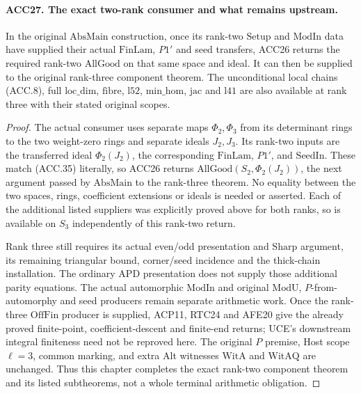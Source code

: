 \documentclass[11pt,a4paper]{article}
\numberwithin{equation}{section}
\theoremstyle{remark}\newtheorem{remark}[theorem]{Remark}
\begin{document}
\paragraph{ACC27. The exact two-rank consumer and what remains upstream.}
\label{claim:ACC27}
In the original \(\mathrm{AbsMain}\) construction, once its
rank-two \(\mathrm{Setup}\) and \(\mathrm{ModIn}\) data have
supplied their actual \(\mathrm{FinLam}\), \(P1'\) and seed
transfers, ACC26 returns the required rank-two \(\mathrm{AllGood}\)
on that same space and ideal.  It can then be supplied to the
original rank-three component theorem.  The unconditional local
chains (ACC.8), full \(\mathrm{loc\_\allowbreak dim}\), \(\mathrm{fibre}\),
\(\mathrm{l52}\), \(\mathrm{min\_\allowbreak hom}\), \(\mathrm{jac}\)
and \(\mathrm{l41}\) are also available at rank three with
their stated original scopes.

\begin{proof}
The actual consumer uses separate maps \(\Phi_2,\Phi_3\) from
its determinant rings to the two weight-zero rings and separate
ideals \(J_2,J_3\).  Its rank-two inputs are the transferred
ideal \(\Phi_2(J_2)\), the corresponding \(\mathrm{FinLam}\),
\(P1'\), and \(\mathrm{SeedIn}\).  These match (ACC.35)
literally, so ACC26 returns
\(\mathrm{AllGood}(S_2,\Phi_2(J_2))\), the next argument
passed by \(\mathrm{AbsMain}\) to the rank-three theorem.
No equality between the two spaces, rings, coefficient extensions
or ideals is needed or asserted.  Each of the additional listed
suppliers was explicitly proved above for both ranks, so is
available on \(S_3\) independently of this rank-two return.

Rank three still requires its actual even/odd presentation and
\(\mathrm{Sharp}\) argument, its remaining triangular bound,
corner/seed incidence and the thick-chain installation.  The ordinary
APD presentation does not supply those additional parity equations.
The actual automorphic \(\mathrm{ModIn}\) and original
\(\mathrm{ModU}\), \(P\)-from-automorphy and seed producers
remain separate arithmetic work.  Once the rank-three \(\mathrm{OffFin}\)
producer is supplied, ACP11, RTC24 and AFE20 give the already
proved finite-point, coefficient-descent and finite-end returns;
UCE's downstream integral finiteness need not be reproved here.
The original \(P\) premise, Host scope \(\ell=3\), common
marking, and extra Alt witnesses \(\mathrm{WitA}\) and
\(\mathrm{WitAQ}\) are unchanged.  Thus this chapter completes
the exact rank-two component theorem and its listed subtheorems,
not a whole terminal arithmetic obligation.
\end{proof}
\end{document}
